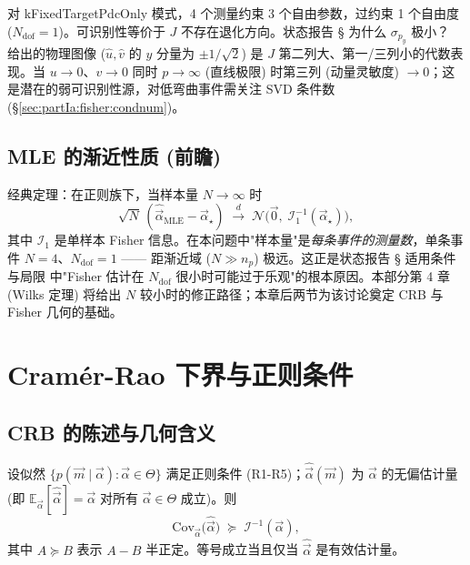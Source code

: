 对 kFixedTargetPdcOnly 模式，4 个测量约束 3 个自由参数，过约束 1 个自由度 ($N_\mathrm{dof}=1$)。可识别性等价于 $J$ 不存在退化方向。状态报告 \StatusReport § 为什么 $\sigma_{p_y}$ 极小？ 给出的物理图像 ($\hat u,\hat v$ 的 $y$ 分量为 $\pm 1/\sqrt 2$) 是 $J$ 第二列大、第一/三列小的代数表现。当 $u\to 0$、$v\to 0$ 同时 $p\to\infty$ (直线极限) 时第三列 (动量灵敏度) $\to 0$；这是潜在的弱可识别性源，对低弯曲事件需关注 SVD 条件数 (§\ref{sec:partIa:fisher:condnum})。

\subsection{MLE 的渐近性质 (前瞻)}
\label{sec:partIa:lik:asymptotic}

经典定理：在正则族下，当样本量 $N\to\infty$ 时
\begin{equation}
  \sqrt N\,(\hat{\vec\alpha}_\mathrm{MLE}-\vec\alpha_\star)
  \;\xrightarrow{d}\; \mathcal N\bigl(\vec 0,\;\mathcal I_1^{-1}(\vec\alpha_\star)\bigr),
  \label{eq:partIa:lik:asymptotic}
\end{equation}
其中 $\mathcal I_1$ 是单样本 Fisher 信息。在本问题中"样本量"是\emph{每条事件的测量数}，单条事件 $N=4$、$N_\mathrm{dof}=1$ —— 距渐近域 ($N\gg n_p$) 极远。这正是状态报告 § 适用条件与局限 中"Fisher 估计在 $N_\mathrm{dof}$ 很小时可能过于乐观"的根本原因。本部分第 4 章 (Wilks 定理) 将给出 $N$ 较小时的修正路径；本章后两节为该讨论奠定 CRB 与 Fisher 几何的基础。

\section{Cramér-Rao 下界与正则条件}
\label{sec:partIa:crb}

\subsection{CRB 的陈述与几何含义}
\label{sec:partIa:crb:statement}

\begin{theorem}\label{thm:partIa:crb}
  设似然 $\{p(\vec m\mid\vec\alpha):\vec\alpha\in\Theta\}$ 满足正则条件 (R1-R5)；$\hat{\vec\alpha}(\vec m)$ 为 $\vec\alpha$ 的无偏估计量 (即 $\mathbb E_{\vec\alpha}[\hat{\vec\alpha}]=\vec\alpha$ 对所有 $\vec\alpha\in\Theta$ 成立)。则
  \begin{equation}
    \mathrm{Cov}_{\vec\alpha}\bigl(\hat{\vec\alpha}\bigr) \;\succeq\; \mathcal I^{-1}(\vec\alpha),
    \label{eq:partIa:crb:bound}
  \end{equation}
  其中 $A\succeq B$ 表示 $A-B$ 半正定。等号成立当且仅当 $\hat{\vec\alpha}$ 是有效估计量。
\end{theorem}

